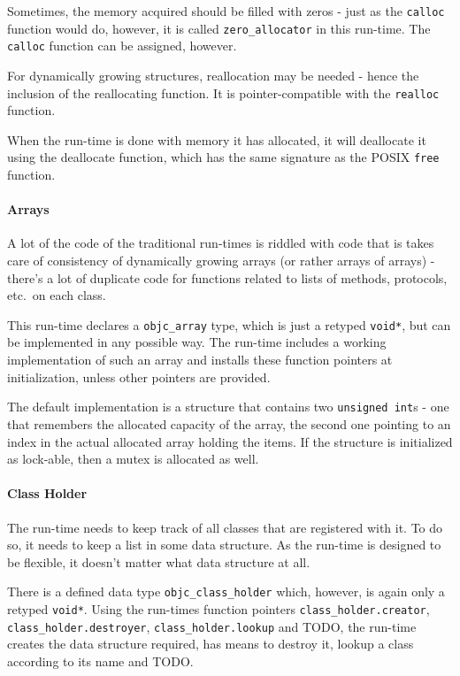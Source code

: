 Sometimes, the memory acquired should be filled with zeros - just as the \verb=calloc= function would do, however, it is called \verb=zero_allocator= in this run-time. The \verb=calloc= function can be assigned, however.

For dynamically growing structures, reallocation may be needed - hence the inclusion of the reallocating function. It is pointer-compatible with the \verb=realloc= function.

When the run-time is done with memory it has allocated, it will deallocate it using the deallocate function, which has the same signature as the POSIX \verb=free= function.

\paragraph{Arrays}

A lot of the code of the traditional run-times is riddled with code that is takes care of consistency of dynamically growing arrays (or rather arrays of arrays) - there's a lot of duplicate code for functions related to lists of methods, protocols, etc.\ on each class.

This run-time declares a \verb=objc_array= type, which is just a retyped \verb=void*=, but can be implemented in any possible way. The run-time includes a working implementation of such an array and installs these function pointers at initialization, unless other pointers are provided.

The default implementation is a structure that contains two \verb=unsigned int=s - one that remembers the allocated capacity of the array, the second one pointing to an index in the actual allocated array holding the items. If the structure is initialized as lock-able, then a mutex is allocated as well.


\paragraph{Class Holder}

The run-time needs to keep track of all classes that are registered with it. To do so, it needs to keep a list in some data structure. As the run-time is designed to be flexible, it doesn't matter what data structure at all.

There is a defined data type \verb=objc_class_holder= which, however, is again only a retyped \verb=void*=. Using the run-times function pointers \verb=class_holder.creator=, \verb=class_holder.destroyer=, \verb=class_holder.lookup= and TODO, the run-time creates the data structure required, has means to destroy it, lookup a class according to its name and TODO.

